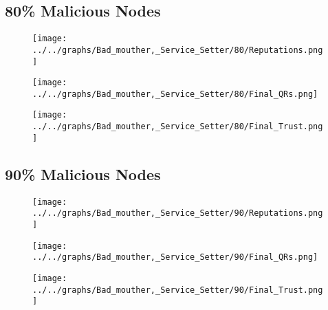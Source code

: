 \begin{minipage}[t]{0.49\columnwidth}
\subsection*{80\% Malicious Nodes}
    \begin{figure}[H]
        \centering
        \texttt{[image: ../../graphs/Bad\_mouther,\_Service\_Setter/80/Reputations.png]}
    \end{figure}
    \begin{figure}[H]
        \centering
        \texttt{[image: ../../graphs/Bad\_mouther,\_Service\_Setter/80/Final\_QRs.png]}
    \end{figure}
\end{minipage}
\begin{minipage}[t]{0.49\columnwidth}
    \begin{figure}[H]
        \centering
        \texttt{[image: ../../graphs/Bad\_mouther,\_Service\_Setter/80/Final\_Trust.png]}
    \end{figure}
\end{minipage}

\begin{minipage}[t]{0.49\columnwidth}
\subsection*{90\% Malicious Nodes}
    \begin{figure}[H]
        \centering
        \texttt{[image: ../../graphs/Bad\_mouther,\_Service\_Setter/90/Reputations.png]}
    \end{figure}
    \begin{figure}[H]
        \centering
        \texttt{[image: ../../graphs/Bad\_mouther,\_Service\_Setter/90/Final\_QRs.png]}
    \end{figure}
\end{minipage}
\begin{minipage}[t]{0.49\columnwidth}
    \begin{figure}[H]
        \centering
        \texttt{[image: ../../graphs/Bad\_mouther,\_Service\_Setter/90/Final\_Trust.png]}
    \end{figure}
\end{minipage}
\newpage

